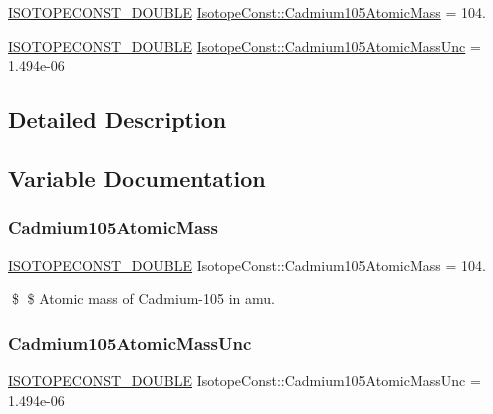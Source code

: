 \begin{DoxyCompactItemize}
\item 
\mbox{\hyperlink{group___isotope_const-_macros_ga8f45a7272ce02c0b4c65c44636ed719a}{I\+S\+O\+T\+O\+P\+E\+C\+O\+N\+S\+T\+\_\+\+D\+O\+U\+B\+LE}} \mbox{\hyperlink{group___isotope_const-_cadmium-_cd105_ga801f5dbe653fa482d45e87af83de5e0b}{Isotope\+Const\+::\+Cadmium105\+Atomic\+Mass}} = 104.
\item 
\mbox{\hyperlink{group___isotope_const-_macros_ga8f45a7272ce02c0b4c65c44636ed719a}{I\+S\+O\+T\+O\+P\+E\+C\+O\+N\+S\+T\+\_\+\+D\+O\+U\+B\+LE}} \mbox{\hyperlink{group___isotope_const-_cadmium-_cd105_gaff16caeb460be7009120108219d9625e}{Isotope\+Const\+::\+Cadmium105\+Atomic\+Mass\+Unc}} = 1.\+494e-\/06
\end{DoxyCompactItemize}


\subsection{Detailed Description}


\subsection{Variable Documentation}
\mbox{\label{group___isotope_const-_cadmium-_cd105_ga801f5dbe653fa482d45e87af83de5e0b}} 
\subsubsection{\texorpdfstring{Cadmium105\+Atomic\+Mass}{Cadmium105AtomicMass}}
{\footnotesize\ttfamily \mbox{\hyperlink{group___isotope_const-_macros_ga8f45a7272ce02c0b4c65c44636ed719a}{I\+S\+O\+T\+O\+P\+E\+C\+O\+N\+S\+T\+\_\+\+D\+O\+U\+B\+LE}} Isotope\+Const\+::\+Cadmium105\+Atomic\+Mass = 104.}

\$ \$ Atomic mass of Cadmium-\/105 in amu. \mbox{\label{group___isotope_const-_cadmium-_cd105_gaff16caeb460be7009120108219d9625e}} 
\subsubsection{\texorpdfstring{Cadmium105\+Atomic\+Mass\+Unc}{Cadmium105AtomicMassUnc}}
{\footnotesize\ttfamily \mbox{\hyperlink{group___isotope_const-_macros_ga8f45a7272ce02c0b4c65c44636ed719a}{I\+S\+O\+T\+O\+P\+E\+C\+O\+N\+S\+T\+\_\+\+D\+O\+U\+B\+LE}} Isotope\+Const\+::\+Cadmium105\+Atomic\+Mass\+Unc = 1.\+494e-\/06}

